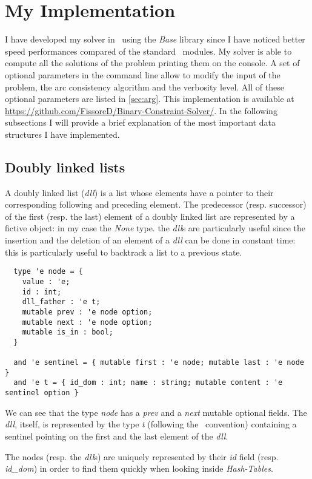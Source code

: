 \documentclass{rapport}
\begin{document}
\section{My Implementation}

I have developed my solver in \ml\ using the \textit{Base} library since I have noticed better speed performances compared of the standard \ml\ modules. My solver is able to compute all the solutions of the problem printing them on the console. A set of optional parameters in the command line allow to modify the input of the problem, the arc consistency algorithm and the verbosity level. All of these optional parameters are listed in \cref{sec:arg}. This implementation is available at \url{https://github.com/FissoreD/Binary-Constraint-Solver/}. In the following subsections I will provide a brief explanation of the most important data structures I have implemented.

\subsection{Doubly linked lists}

A doubly linked list (\textit{dll}) is a list whose elements have a pointer to their corresponding following and preceding element. The predecessor (resp. successor) of the first (resp. the last) element of a doubly linked list are represented by a fictive object: in my case the \textit{None} type. the \textit{dll}s are particularly useful since the insertion and the deletion of an element of a \textit{dll} can be done in constant time: this is particularly useful to backtrack a list to a previous state.

\begin{verbatim}
  type 'e node = {
    value : 'e;
    id : int;
    dll_father : 'e t;
    mutable prev : 'e node option;
    mutable next : 'e node option;
    mutable is_in : bool;
  }
  
  and 'e sentinel = { mutable first : 'e node; mutable last : 'e node }
  and 'e t = { id_dom : int; name : string; mutable content : 'e sentinel option }
\end{verbatim}

We can see that the type \textit{node} has a \textit{prev} and a \textit{next} mutable optional fields. The \textit{dll}, itself, is represented by the type \textit{t} (following the \ml\ convention) containing a sentinel pointing on the first and the last element of the \textit{dll}.

The nodes (resp. the \textit{dll}s) are uniquely represented by their \textit{id} field (resp. \textit{id\_dom}) in order to find them quickly when looking inside \textit{Hash-Tables}.
\end{document}
